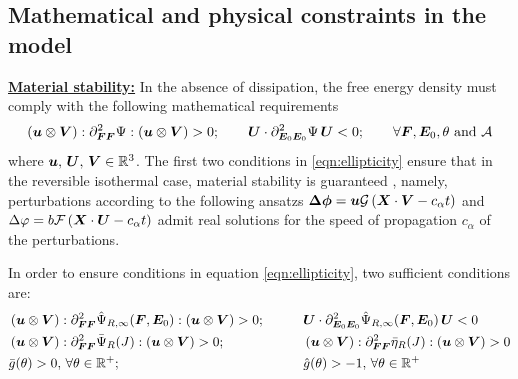 
\subsection{Mathematical and physical constraints in the model}

\vspace{2mm}
\noindent \textbf{\underline{Material stability:}} In the absence of dissipation, the free energy density must comply with the following mathematical requirements
%
\begin{equation}\label{eqn:ellipticity}
	\left(\boldsymbol{u}\otimes \boldsymbol{V}\right):\partial^2_{\boldsymbol{FF}}\Psi:\left(\boldsymbol{u}\otimes \boldsymbol{V}\right)>0;\qquad \boldsymbol{U}\cdot \partial^2_{\boldsymbol{E}_0\boldsymbol{E}_0}\Psi\,\boldsymbol{U}<0;\qquad \forall \boldsymbol{F}, \boldsymbol{E}_0, \theta \text{ and } \mathcal{A} 
\end{equation}
%
where $\boldsymbol{u},\,\boldsymbol{U},\,\boldsymbol{V}\in\mathbb{R}^3$. The first two conditions in \eqref{eqn:ellipticity} ensure that in the reversible isothermal case, material stability is guaranteed \cite{Schroder_2005}, namely, perturbations according to the following ansatzs $\boldsymbol{\Delta}\boldsymbol{\phi}=\boldsymbol{u}\mathcal{G}\left(\boldsymbol{X}\cdot \boldsymbol{V} - c_{\alpha}t\right)$
and $\Delta \varphi=b \mathcal{F}\left(\boldsymbol{X}\cdot\boldsymbol{U} - c_{\alpha}t\right)$ admit real solutions for the speed of propagation $c_{\alpha}$ of the perturbations. 

In order to ensure conditions in equation \eqref{eqn:ellipticity}, two sufficient conditions are:
\begin{subequations}\label{eqn:sufficient conditions 1}
	\begin{align}
		&\left(\boldsymbol{u}\otimes \boldsymbol{V}\right): \partial^2_{\boldsymbol{FF}}\hat{\Psi}_{R,\infty}(\boldsymbol{F},\boldsymbol{E}_0):	\left(\boldsymbol{u}\otimes \boldsymbol{V}\right)>0;&\qquad 		&\boldsymbol{U}\cdot \partial^2_{\boldsymbol{E}_0\boldsymbol{E}_0}\hat{\Psi}_{R,\infty}(\boldsymbol{F},\boldsymbol{E}_0)\,	\boldsymbol{U}<0	\label{eqn:sufficient conditions 1a}\\
		&\left(\boldsymbol{u}\otimes \boldsymbol{V}\right): \partial^2_{\boldsymbol{FF}}\bar{\Psi}_{R}(J):	\left(\boldsymbol{u}\otimes \boldsymbol{V}\right)>0;&\qquad
		&\left(\boldsymbol{u}\otimes \boldsymbol{V}\right): \partial^2_{\boldsymbol{FF}}\bar{\eta}_{R}(J):	\left(\boldsymbol{u}\otimes \boldsymbol{V}\right)>0\label{eqn:sufficient conditions 1b}\\
		&\bar{g}(\theta)>0,\,\forall \theta \in \mathbb{R}^+;&\qquad 	&\hat{g}(\theta)>-1,\,\forall \theta \in \mathbb{R}^+ \label{eqn:sufficient conditions 1c}
		\end{align}
\end{subequations}
 



